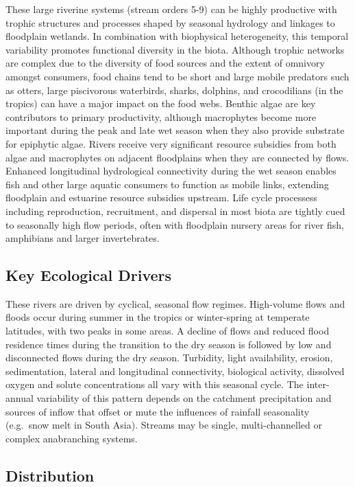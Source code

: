 \documentclass[
  letterpaper,
  DIV=11,
  numbers=noendperiod]{scrartcl}
\begin{document}
These large riverine systems (stream orders 5-9) can be highly
productive with trophic structures and processes shaped by seasonal
hydrology and linkages to floodplain wetlands. In combination with
biophysical heterogeneity, this temporal variability promotes functional
diversity in the biota. Although trophic networks are complex due to the
diversity of food sources and the extent of omnivory amongst consumers,
food chains tend to be short and large mobile predators such as otters,
large piscivorous waterbirds, sharks, dolphins, and crocodilians (in the
tropics) can have a major impact on the food webs. Benthic algae are key
contributors to primary productivity, although macrophytes become more
important during the peak and late wet season when they also provide
substrate for epiphytic algae. Rivers receive very significant resource
subsidies from both algae and macrophytes on adjacent floodplains when
they are connected by flows. Enhanced longitudinal hydrological
connectivity during the wet season enables fish and other large aquatic
consumers to function as mobile links, extending floodplain and
estuarine resource subsidies upstream. Life cycle processess including
reproduction, recruitment, and dispersal in most biota are tightly cued
to seasonally high flow periods, often with floodplain nursery areas for
river fish, amphibians and larger invertebrates.

\subsection{Key Ecological Drivers}\label{key-ecological-drivers-4}

These rivers are driven by cyclical, seasonal flow regimes. High-volume
flows and floods occur during summer in the tropics or winter-spring at
temperate latitudes, with two peaks in some areas. A decline of flows
and reduced flood residence times during the transition to the dry
season is followed by low and disconnected flows during the dry season.
Turbidity, light availability, erosion, sedimentation, lateral and
longitudinal connectivity, biological activity, dissolved oxygen and
solute concentrations all vary with this seasonal cycle. The
inter-annual variability of this pattern depends on the catchment
precipitation and sources of inflow that offset or mute the influences
of rainfall seasonality (e.g.~snow melt in South Asia). Streams may be
single, multi-channelled or complex anabranching systems.

\subsection{Distribution}\label{distribution-4}
\end{document}
